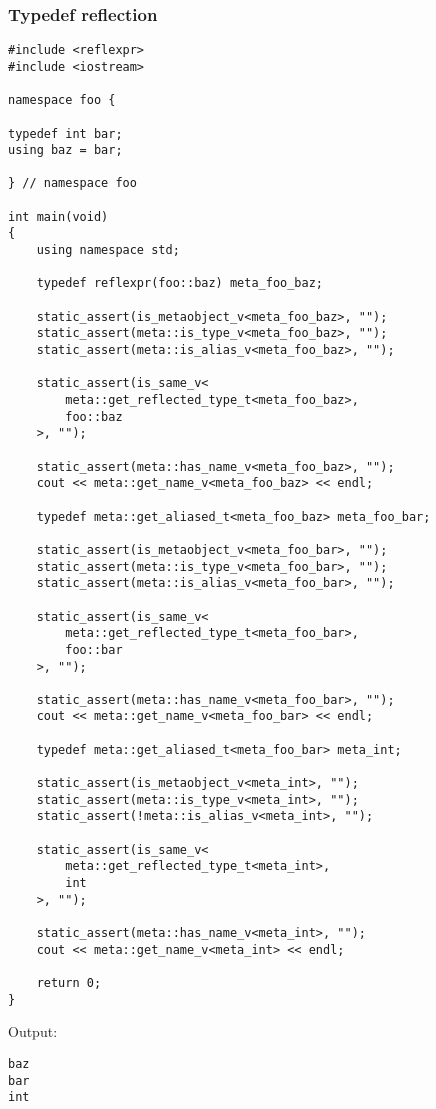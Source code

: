 \subsubsection{Typedef reflection}

\begin{verbatim}
#include <reflexpr>
#include <iostream>

namespace foo {

typedef int bar;
using baz = bar;

} // namespace foo

int main(void)
{
	using namespace std;

	typedef reflexpr(foo::baz) meta_foo_baz;

	static_assert(is_metaobject_v<meta_foo_baz>, "");
	static_assert(meta::is_type_v<meta_foo_baz>, "");
	static_assert(meta::is_alias_v<meta_foo_baz>, "");

	static_assert(is_same_v<
		meta::get_reflected_type_t<meta_foo_baz>,
		foo::baz
	>, "");

	static_assert(meta::has_name_v<meta_foo_baz>, "");
	cout << meta::get_name_v<meta_foo_baz> << endl;

	typedef meta::get_aliased_t<meta_foo_baz> meta_foo_bar;

	static_assert(is_metaobject_v<meta_foo_bar>, "");
	static_assert(meta::is_type_v<meta_foo_bar>, "");
	static_assert(meta::is_alias_v<meta_foo_bar>, "");

	static_assert(is_same_v<
		meta::get_reflected_type_t<meta_foo_bar>,
		foo::bar
	>, "");

	static_assert(meta::has_name_v<meta_foo_bar>, "");
	cout << meta::get_name_v<meta_foo_bar> << endl;

	typedef meta::get_aliased_t<meta_foo_bar> meta_int;

	static_assert(is_metaobject_v<meta_int>, "");
	static_assert(meta::is_type_v<meta_int>, "");
	static_assert(!meta::is_alias_v<meta_int>, "");

	static_assert(is_same_v<
		meta::get_reflected_type_t<meta_int>,
		int
	>, "");

	static_assert(meta::has_name_v<meta_int>, "");
	cout << meta::get_name_v<meta_int> << endl;

	return 0;
}

\end{verbatim}

Output:

\begin{verbatim}
baz
bar
int
\end{verbatim}

